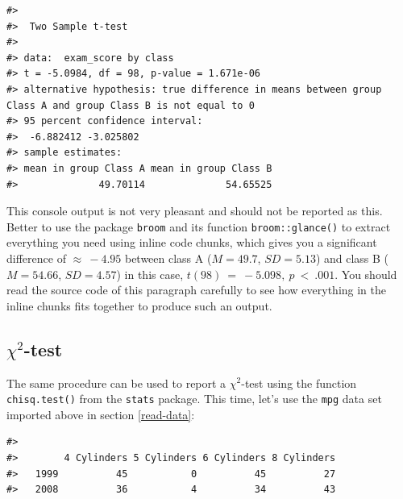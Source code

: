 \documentclass[
  11pt,
  a4paper,
  twoside]{scrbook}
\newenvironment{Shaded}{\begin{snugshade}}{\end{snugshade}}
\newcommand{\CommentTok}[1]{\textcolor[rgb]{0.56,0.35,0.01}{\textit{#1}}}
\newcommand{\FunctionTok}[1]{\textcolor[rgb]{0.00,0.00,0.00}{#1}}
\newcommand{\NormalTok}[1]{#1}
\newcommand{\OtherTok}[1]{\textcolor[rgb]{0.56,0.35,0.01}{#1}}
\newcommand{\SpecialCharTok}[1]{\textcolor[rgb]{0.00,0.00,0.00}{#1}}
\begin{document}
\linespread{1}

\begin{verbatim}
#> 
#>  Two Sample t-test
#> 
#> data:  exam_score by class
#> t = -5.0984, df = 98, p-value = 1.671e-06
#> alternative hypothesis: true difference in means between group Class A and group Class B is not equal to 0
#> 95 percent confidence interval:
#>  -6.882412 -3.025802
#> sample estimates:
#> mean in group Class A mean in group Class B 
#>              49.70114              54.65525
\end{verbatim}

This console output is not very pleasant and should not be reported as this. Better to use the package \texttt{broom} and its function \texttt{broom::glance()} to extract everything you need using inline code chunks, which gives you a significant difference of \(\approx~-4.95\) between class A (\(M = 49.7\), \(SD = 5.13\)) and class B (\(M = 54.66\), \(SD = 4.57\)) in this case, \(t(98)~=~-5.098,~p~<~.001\). You should read the source code of this paragraph carefully to see how everything in the inline chunks fits together to produce such an output.

\hypertarget{chi2-test}{%
\subsection{\texorpdfstring{\(\chi^2\)-test}{\textbackslash chi\^{}2-test}}\label{chi2-test}}

The same procedure can be used to report a \(\chi^2\)-test using the function \texttt{chisq.test()} from the \texttt{stats} package. This time, let's use the \texttt{mpg} data set imported above in section \ref{read-data}:

\linespread{1}

\begin{Shaded}
\end{Shaded}

\linespread{1}

\begin{verbatim}
#>       
#>        4 Cylinders 5 Cylinders 6 Cylinders 8 Cylinders
#>   1999          45           0          45          27
#>   2008          36           4          34          43
\end{verbatim}
\end{document}
